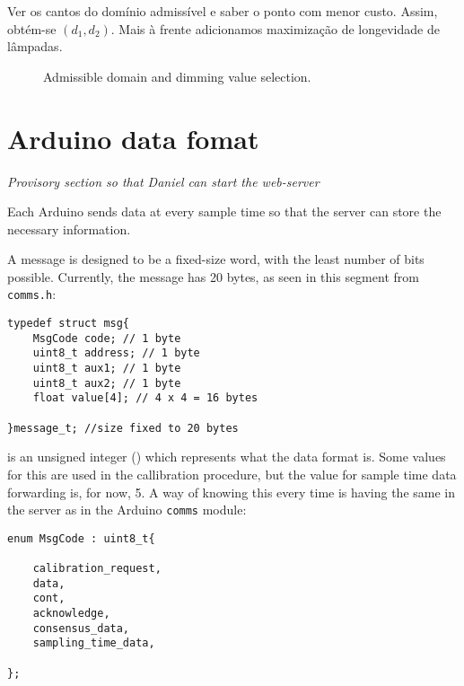 \documentclass[english,palatino]{ist-report}
\begin{document}
Ver os cantos do domínio admissível e saber o ponto com menor custo. Assim, obtém-se $(d_1,d_2)$. Mais à frente adicionamos maximização de longevidade de lâmpadas.
\begin{figure}[ht]
	\centering
	
	\caption{Admissible domain and dimming value selection.}
\end{figure}

\section{Arduino data fomat}

{\centering \textit{Provisory section so that Daniel can start the web-server}}

Each Arduino sends data at every sample time so that the server can store the necessary information. 

A message is designed to be a fixed-size word, with the least number of bits possible.
Currently, the message has 20 bytes, as seen in this segment from \texttt{comms.h}:
\begin{verbatim}
typedef struct msg{
    MsgCode code; // 1 byte
    uint8_t address; // 1 byte
    uint8_t aux1; // 1 byte
    uint8_t aux2; // 1 byte
    float value[4]; // 4 x 4 = 16 bytes

}message_t; //size fixed to 20 bytes
\end{verbatim}

 is an unsigned integer () which represents what the data format is.
Some values for this are used in the callibration procedure, but the value for sample time data forwarding is, for now, 5.
A way of knowing this every time is having the same  in the server as in the Arduino \texttt{comms} module:
\begin{verbatim}
enum MsgCode : uint8_t{

    calibration_request,
    data,
    cont,
    acknowledge,
    consensus_data,
    sampling_time_data,

};
\end{verbatim}
\end{document}
